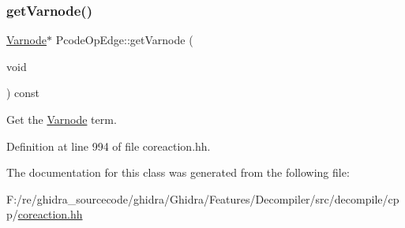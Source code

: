 \subsubsection{\texorpdfstring{getVarnode()}{getVarnode()}}
{\footnotesize\ttfamily \mbox{\hyperlink{class_varnode}{Varnode}}$\ast$ Pcode\+Op\+Edge\+::get\+Varnode (\begin{DoxyParamCaption}\item[{void}]{ }\end{DoxyParamCaption}) const\hspace{0.3cm}{\ttfamily [inline]}}



Get the \mbox{\hyperlink{class_varnode}{Varnode}} term. 



Definition at line 994 of file coreaction.\+hh.



The documentation for this class was generated from the following file\+:\begin{DoxyCompactItemize}
\item 
F\+:/re/ghidra\+\_\+sourcecode/ghidra/\+Ghidra/\+Features/\+Decompiler/src/decompile/cpp/\mbox{\hyperlink{coreaction_8hh}{coreaction.\+hh}}\end{DoxyCompactItemize}
